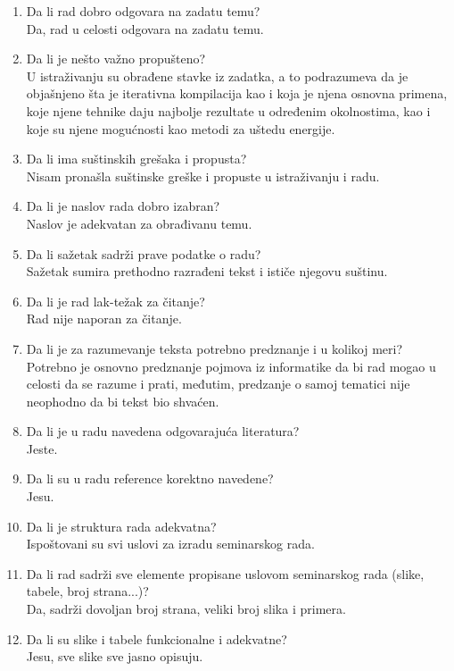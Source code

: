 \documentclass[a4paper]{report}
\begin{document}
\begin{enumerate}
\item Da li rad dobro odgovara na zadatu temu?\\
Da, rad u celosti odgovara na zadatu temu.
\item Da li je nešto važno propušteno?\\
U istraživanju su obrađene stavke iz zadatka, a to podrazumeva da je objašnjeno šta je iterativna kompilacija kao i koja je njena osnovna primena, koje njene tehnike daju najbolje rezultate u određenim okolnostima, kao i koje su njene mogućnosti kao metodi za uštedu energije.
\item Da li ima suštinskih grešaka i propusta?\\
Nisam pronašla suštinske greške i propuste u istraživanju i radu.
\item Da li je naslov rada dobro izabran?\\
Naslov je adekvatan za obrađivanu temu.
\item Da li sažetak sadrži prave podatke o radu?\\
Sažetak sumira prethodno razrađeni tekst i ističe njegovu suštinu.
\item Da li je rad lak-težak za čitanje?\\
Rad nije naporan za čitanje.
\item Da li je za razumevanje teksta potrebno predznanje i u kolikoj meri?\\
Potrebno je osnovno predznanje pojmova iz informatike da bi rad mogao u celosti da se razume i prati, međutim, predzanje o samoj tematici nije neophodno da bi tekst bio shvaćen.
\item Da li je u radu navedena odgovarajuća literatura?\\
Jeste.
\item Da li su u radu reference korektno navedene?\\
Jesu.
\item Da li je struktura rada adekvatna?\\
Ispoštovani su svi uslovi za izradu seminarskog rada.
\item Da li rad sadrži sve elemente propisane uslovom seminarskog rada (slike, tabele, broj strana...)?\\
Da, sadrži dovoljan broj strana, veliki broj slika i primera.
\item Da li su slike i tabele funkcionalne i adekvatne?\\
Jesu, sve slike sve jasno opisuju.
\end{enumerate}
\end{document}
